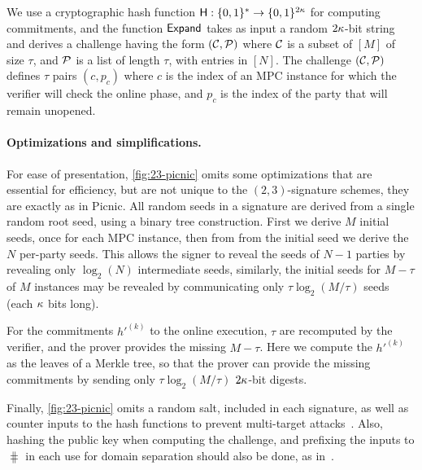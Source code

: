 We use a cryptographic hash function $\textsf{H}: \{0,1\}^*\to \{0,1\}^{2\kappa}$
for computing commitments, and the function $\textsf{Expand}$ takes as input a random $2\kappa$-bit string
and derives a challenge having the form $(\mathcal{C}, \mathcal{P})$ where $\mathcal{C}$ is a subset of $[M]$
of size $\tau$, and $\mathcal{P}$ is a list of length $\tau$, with entries in $[N]$. 
The challenge $(\mathcal{C}, \mathcal{P})$ defines $\tau$ pairs $(c,p_c)$ where $c$ is the
index of  an MPC instance for which the verifier will check the online phase,
and $p_c$ is the index of the party that will remain unopened. 


\paragraph{Optimizations and simplifications.}
For ease of presentation, \cref{fig:23-picnic} omits some optimizations that
are essential for efficiency, but are not unique to the $(2,3)$-signature schemes, 
they are exactly as in Picnic. All random seeds in a signature are derived from
a single random root seed, using a binary tree construction. First we derive
$M$ initial seeds, once for each MPC instance, then from from the initial seed
we derive the $N$ per-party seeds. This allows the signer to reveal the seeds
of $N-1$ parties by revealing only $\log_2(N)$ intermediate seeds, similarly, 
the initial seeds for $M-\tau$ of $M$ instances may be revealed by communicating
only $\tau\log_2(M/\tau)$ seeds (each $\kappa$ bits long).

For the commitments $h'^{(k)}$ to the online execution, $\tau$ are recomputed
by the verifier, and the prover provides the missing $M-\tau$.  Here we compute
the $h'^{(k)}$ as the leaves of a Merkle tree,  so that the prover can provide
the missing commitments by sending only $\tau\log_2(M/\tau)$ $2\kappa$-bit
digests. 

Finally, \cref{fig:23-picnic} omits a random salt, included in each signature, as well as counter
inputs to the hash functions to prevent multi-target
attacks~\cite{dinur2019-picnic-attacks}. Also, hashing the public key when computing the
challenge, and prefixing the inputs to $\hash$ in each use for domain
separation should also be done, as in~\cite{picnic-spec}. 

